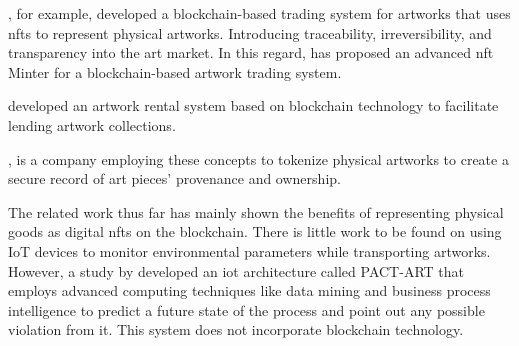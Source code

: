 \textcite{artchain}, for example, developed a blockchain-based trading system for artworks that uses \glspl{nft} to represent physical artworks. Introducing traceability, irreversibility, and transparency into the art market. 
%
In this regard, \textcite{nftminter} has proposed an advanced \gls{nft} Minter for a blockchain-based artwork trading system. 

\textcite{artrentalblockchain} developed an artwork rental system based on blockchain technology to facilitate lending artwork collections.

\textcite{artory}, is a company employing these concepts to tokenize physical artworks to create a secure record of art pieces' provenance and ownership. 

The related work thus far has mainly shown the benefits of representing physical goods as digital \glspl{nft} on the blockchain. There is little work to be found on using IoT devices to monitor environmental parameters while transporting artworks. However, a study by \textcite{pactart} developed an \gls{iot} architecture called PACT-ART that employs advanced computing techniques like data mining and business process intelligence to predict a future state of the process and point out any possible violation from it. This system does not incorporate blockchain technology.
